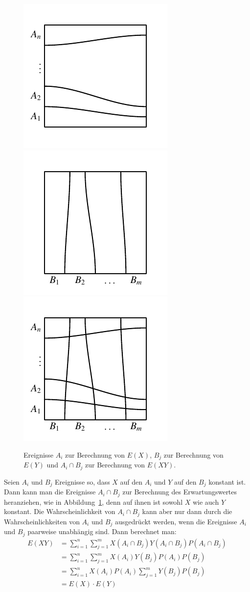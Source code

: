 \begin{figure}
\begin{center}
\includegraphics[width=0.3\hsize]{images/erwartung-4}
\includegraphics[width=0.3\hsize]{images/erwartung-3}
\includegraphics[width=0.3\hsize]{images/erwartung-2}
\end{center}
\caption{Ereignisse $A_i$ zur Berechnung von $E(X)$, $B_j$ zur Berechnung
von $E(Y)$ und $A_i\cap B_j$ zur Berechnung von $E(XY)$.
\label{productexpectation}}
\end{figure}
Seien $A_i$ und $B_j$ Ereignisse so, dass $X$ auf den $A_i$ und $Y$ auf
den $B_j$ konstant ist.
Dann kann man die Ereignisse $A_i\cap B_j$
zur Berechnung des Erwartungswertes heranziehen, wie in
Abbildung~\ref{productexpectation}, denn auf ihnen ist sowohl $X$ wie
auch $Y$ konstant.
Die Wahrscheinlichkeit von $A_i\cap B_j$ kann aber nur dann
durch die Wahrscheinlichkeiten von $A_i$ und $B_j$ ausgedrückt werden,
wenn die Ereignisse $A_i$ und $B_j$ paarweise
unabhängig sind.
Dann berechnet man:
\begin{align*}
E(XY)&=\sum_{i=1}^n\sum_{j=1}^m X(A_i\cap B_j)Y(A_i\cap B_j)P(A_i\cap B_j)\\
&=\sum_{i=1}^n\sum_{j=1}^m X(A_i)Y(B_j)P(A_i)P(B_j)\\
&=\sum_{i=1}^n X(A_i)P(A_i)\sum_{j=1}^mY(B_j)P(B_j)\\
&=E(X)\cdot E(Y)
\end{align*}
